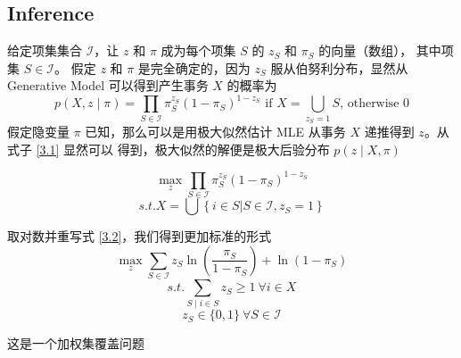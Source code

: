 \documentclass{ctexart}
\newcommand{\scri}[0]{\mathcal{I}}
\begin{document}
\subsection{Inference}

给定项集集合 $\scri$，让 $z$ 和 $\pi$ 成为每个项集 $S$ 的 $z_S$ 和 $\pi_S$ 的向量（数组），
其中项集 $S \in \scri$。
假定 $z$ 和 $\pi$ 是完全确定的，因为 $z_S$ 服从伯努利分布，显然从 Generative Model 可以得到产生事务 $X$ 的概率为
\begin{equation}
\label{3.1}
p(X, z \mid \pi) = \prod_{S \in \scri} \pi_S^{z_S} (1 - \pi_S)^{1 - z_S}
\text{ if } X = \bigcup_{z_S = 1} S \text{, otherwise } 0
\end{equation}
假定隐变量  $\pi$ 已知，那么可以是用极大似然估计 MLE 从事务 $X$ 递推得到 $z$。从式子 \ref{3.1} 显然可以
得到，极大似然的解便是极大后验分布 $p(z \mid X, \pi)$

\begin{equation}
\label{3.2}
\max_z \prod_{S \in \scri} \pi_S^{z_S} (1 - \pi_S)^{1 - z_S}
\end{equation}
$$
s.t. X = \bigcup \left\{ i \in S | S \in \scri, z_S = 1 \right\}
$$

取对数并重写式 \ref{3.2}，我们得到更加标准的形式
\begin{equation}
\label{3.3}
\max_z \sum_{S \in \scri} z_S \ln \left( \frac{\pi_S}{1 - \pi_S} \right) + \ln \left(1 - \pi_S \right)
\end{equation}
$$
s.t. \sum_{S \mid i \in S} z_S \geq 1 \ \forall i \in X
$$
$$
z_S \in \{0, 1\} \ \forall S \in \scri
$$

这是一个加权集覆盖问题 

\pagebreak

\end{document}
